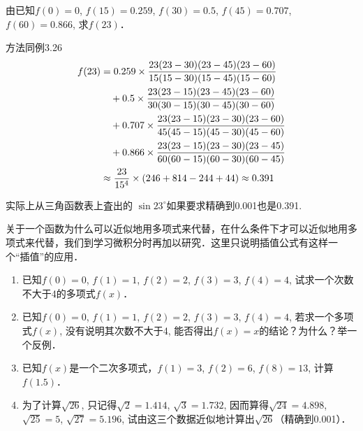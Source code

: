 \begin{solution}
    由已知$f(0)=0$, $f(15)=0. 259$, $f(30)=0. 5$, $f(45)=0. 707$, $f(60)=0. 866$, 求$f(23)$．

方法同例3.26
\[\begin{split}
    f(23)&=0. 259\times \dfrac{23 (23-30) (23-45)(23-60)}{15 (15-30) (15-45)(15-60)}\\
    &\quad +0. 5\times \dfrac{23 (23-15) (23-45)(23-60)}{30 (30-15) (30-45)(30-60)}\\
&\quad +0. 707\times \dfrac{23 (23-15) (23-30)(23-60)}{45 (45-15) (45-30)(45-60)}\\
&\quad +0.866\times \dfrac{23 (23-15) (23-30)(23-45)}{60 (60-15) (60-30)(60-45)}\\
&\approx \dfrac{23}{15^4}\times (246+814-244+44) \approx 0. 391
\end{split}\]

实际上从三角函数表上査出的 $\sin23^{\circ}$如果要求精确到0.001也是0.391.
\end{solution}

关于一个函数为什么可以近似地用多项式来代替，在什么条件下才可以近似地用多项式来代替，我们到学习微积分时再加以研究．这里只说明插值公式有这样一个“插值”的应用．

\begin{ex}
    \begin{enumerate}
    \item 已知$f(0)=0$, $f(1)=1$, $f(2)=2$, $f(3)=3$,
    $f(4)=4$, 试求一个次数不大于4的多项式$f(x)$．
    \item 已知$f(0)=0$, $f(1)=1$, $f(2)=2$, $f(3)=3$,
    $f(4)=4$, 若求一个多项式$f(x)$, 没有说明其次数不大于4, 能否得出$f(x)=x$的结论？为什么？举一个反例．
    \item 已知$f(x)$是一个二次多项式，$f(1)=3$, $f(2)=6$, $f(8)=13$, 计算$f(1. 5)$．
    \item 为了计算$\sqrt{26}$, 只记得$\sqrt{2}=1. 414$, $\sqrt{3}=1. 732$, 因而算得$\sqrt{24}=4.898$, $\sqrt{25}=5$, $\sqrt{27}=5. 196$, 试由这三个数据近似地计算出$\sqrt{26}$（精确到0.001）．
    \end{enumerate} 
    \end{ex}
    
